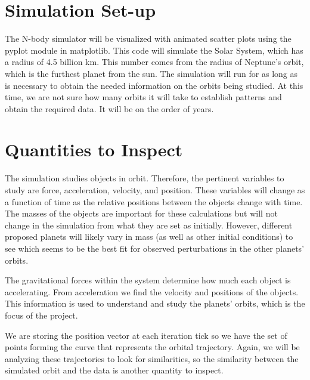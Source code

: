 \documentclass[a4paper,12pt]{article} %
\numberwithin{equation}{section} %
\numberwithin{figure}{section} %
\begin{document}
\section{Simulation Set-up}
The N-body simulator will be visualized with animated scatter plots using the pyplot module in matplotlib. This code will simulate the Solar System, which has a radius of 4.5 billion km. This number comes from the radius of Neptune’s orbit, which is the furthest planet from the sun. The simulation will run for as long as is necessary to obtain the needed information on the orbits being studied. At this time, we are not sure how many orbits it will take to establish patterns and obtain the required data. It will be on the order of years.


\section{Quantities to Inspect}
The simulation studies objects in orbit. Therefore, the pertinent variables to study are force, acceleration, velocity, and position. These variables will change as a function of time as the relative positions between the objects change with time. The masses of the objects are important for these calculations but will not change in the simulation from what they are set as initially. However, different proposed planets will likely vary in mass (as well as other initial conditions) to see which seems to be the best fit for observed perturbations in the other planets’ orbits.
\par
The gravitational forces within the system determine how much each object is accelerating. From acceleration we find the velocity and positions of the objects. This information is used to understand and study the planets’ orbits, which is the focus of the project.
\par
We are storing the position vector at each iteration tick so we have the set of points forming the curve that represents the orbital trajectory.  Again, we will be analyzing these trajectories to look for similarities, so the similarity between the simulated orbit and the data is another quantity to inspect.



\end{document}
